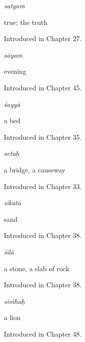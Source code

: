 \noindent\begin{minipage}[t]{\linewidth}
\raggedright
\textbf{}\enspace\emph{satyam}\par
\small true; the truth\par
\footnotesize Introduced in Chapter 27.
\end{minipage}\par\medskip

\noindent\begin{minipage}[t]{\linewidth}
\raggedright
\textbf{}\enspace\emph{sāyam}\par
\small evening\par
\footnotesize Introduced in Chapter 45.
\end{minipage}\par\medskip

\noindent\begin{minipage}[t]{\linewidth}
\raggedright
\textbf{}\enspace\emph{śayyā}\par
\small a bed\par
\footnotesize Introduced in Chapter 35.
\end{minipage}\par\medskip

\noindent\begin{minipage}[t]{\linewidth}
\raggedright
\textbf{}\enspace\emph{setuḥ}\par
\small a bridge, a causeway\par
\footnotesize Introduced in Chapter 33.
\end{minipage}\par\medskip

\noindent\begin{minipage}[t]{\linewidth}
\raggedright
\textbf{}\enspace\emph{sikatā}\par
\small sand\par
\footnotesize Introduced in Chapter 38.
\end{minipage}\par\medskip

\noindent\begin{minipage}[t]{\linewidth}
\raggedright
\textbf{}\enspace\emph{śilā}\par
\small a stone, a slab of rock\par
\footnotesize Introduced in Chapter 38.
\end{minipage}\par\medskip

\noindent\begin{minipage}[t]{\linewidth}
\raggedright
\textbf{}\enspace\emph{siṁhaḥ}\par
\small a lion\par
\footnotesize Introduced in Chapter 48.
\end{minipage}\par\medskip


